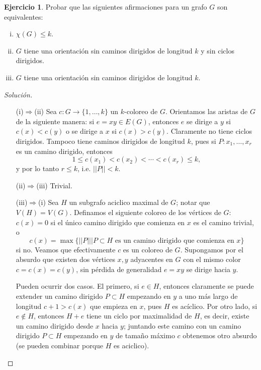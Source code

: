 \documentclass[12pt]{report}
\theoremstyle{plain}
\theoremstyle{definition}
\newtheorem{exercise}[theorem]{Ejercicio}
\newenvironment{solution}{\begin{proof}[Solución]}{\end{proof}}
\newcommand{\Abs}[1]{\left \vert \left \vert #1 \right \vert \right \vert}
\begin{document}
\begin{exercise}\label{ejercicio:coloreo de grafos - ejercicio 1 - nociones equivalentes de acotar numero cromatico y orientacion de grafos}
Probar que las siguientes afirmaciones para un grafo $G$ son equivalentes:
\begin{enumerate}[(i)]
\item $\chi (G) \leq k$.
\item $G$ tiene una orientación sin caminos dirigidos de longitud $k$ y sin ciclos dirigidos.
\item $G$ tiene una orientación sin caminos dirigidos de longitud $k$.
\end{enumerate}
\end{exercise}
\begin{solution}
\begin{enumerate}[(i)]
\item[]
\item[(i)$\Rightarrow$(ii)] Sea $c : G \rightarrow \{1, \ldots, k\}$ un $k$-coloreo de $G$. Orientamos las aristas de $G$ de la siguiente manera: si $e = xy \in E(G)$, entonces $e$ se dirige a $y$ si $c(x) < c(y)$ o se dirige a $x$ si $c(x) > c(y)$. Claramente no tiene ciclos dirigidos. Tampoco tiene caminos dirigidos de longitud $k$, pues si $P: x_1, \ldots, x_r$ es un camino dirigido, entonces
\[
    1 \leq c(x_1) < c(x_2) < \cdots < c(x_r) \leq k,
\]
y por lo tanto $r \leq k$, i.e. $\Abs P < k$.
\item[(ii)$\Rightarrow$(iii)] Trivial.
\item[(iii)$\Rightarrow$(i)] Sea $H$ un subgrafo aciclico maximal de $G$; notar que $V(H) = V(G)$. Definamos el siguiente coloreo de los vértices de $G$: $c(x) = 0$ si el único camino dirigido que comienza en $x$ es el camino trivial, o
\[
    c(x) = \max \{ \Abs P | P \subset H \text{ es un camino dirigido que comienza en $x$} \}
\]
si no. Veamos que efectivamente $c$ es un coloreo de $G$. Supongamos por el absurdo que existen dos vértices $x,y$ adyacentes en $G$ con el mismo color $c = c(x) = c(y)$, sin pérdida de generalidad $e = xy$ se dirige hacia $y$.

Pueden ocurrir dos casos. El primero, si $e \in H$, entonces claramente se puede extender un camino dirigido $P \subset H$ empezando en $y$ a uno más largo de longitud $c + 1 > c(x)$ que empieza en $x$, pues $H$ es acíclico. Por otro lado, si $e \not \in H$, entonces $H + e$ tiene un ciclo por maximalidad de $H$, es decir, existe un camino dirigido desde $x$ hacia $y$; juntando este camino con un camino dirigido $P \subset H$ empezando en $y$ de tamaño máximo $c$ obtenemos otro absurdo (se pueden combinar porque $H$ es aciclico).
\end{enumerate}

\end{solution}
\end{document}
